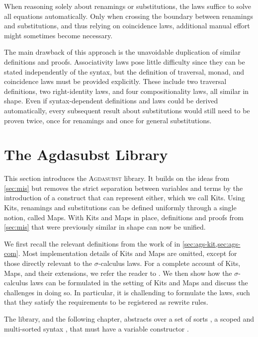 \documentclass[screen,nonacm]{acmart}
\begin{document}
When reasoning solely about renamings or substitutions, the laws suffice to
solve all equations automatically. Only when crossing the boundary between
renamings and substitutions, and thus relying on coincidence laws, additional
manual effort might sometimes become necessary.

The main drawback of this approach is the unavoidable duplication of similar
definitions and proofs. Associativity laws pose little difficulty since they
can be stated independently of the syntax, but the definition of traversal,
monad, and coincidence laws must be provided explicitly. These include two
traversal definitions, two right-identity laws, and four compositionality laws,
all similar in shape. Even if syntax-dependent definitions and laws could be
derived automatically, every subsequent result about substitutions would still
need to be proven twice, once for renamings and once for general substitutions.

\section{The Agdasubst Library}\label{sec:ags}
This section introduces the \textsc{Agdasubst} library. It builds on the ideas
from \cref{sec:mis} but removes the strict separation between variables and
terms by the introduction of a construct that can represent either, which we
call Kits. Using Kits, renamings and substitutions can be defined uniformly
through a single notion, called Maps. With Kits and Maps in place, definitions
and proofs from \cref{sec:mis} that were previously similar in shape can now be
unified.

We first recall the relevant definitions from the work of
\citet{saffrich:LIPIcs.ITP.2024.32} in \cref{sec:ags-kit,sec:ags-com}. Most
implementation details of Kits and Maps are omitted, except for those directly
relevant to the $σ$-calculus laws. For a complete account of Kits, Maps, and
their extensions, we refer the reader to \citet{saffrich:LIPIcs.ITP.2024.32}.
We then show how the $σ$-calculus laws can be formulated in the setting of Kits
and Maps and discuss the challenges in doing so. In particular, it is
challending to formulate the laws, such that they satisfy the requirements to
be registered as rewrite rules.

The library, and the following chapter, abstracts over a set of sorts
\ASortParam, a scoped and multi-sorted syntax \AScopedT, that must have a
variable constructor \AVarCstr.
\end{document}
